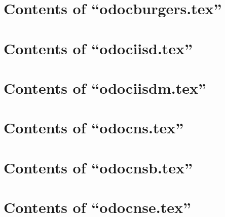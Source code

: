 \begin{itemize}

\end{itemize}

\section{Contents of ``odocburgers.tex''}

\begin{itemize}

\end{itemize}

\section{Contents of ``odociisd.tex''}

\begin{itemize}

\end{itemize}

\section{Contents of ``odociisdm.tex''}

\begin{itemize}

\end{itemize}

\section{Contents of ``odocns.tex''}

\begin{itemize}

\end{itemize}

\section{Contents of ``odocnsb.tex''}

\begin{itemize}

\end{itemize}

\section{Contents of ``odocnse.tex''}

\begin{itemize}

\end{itemize}

